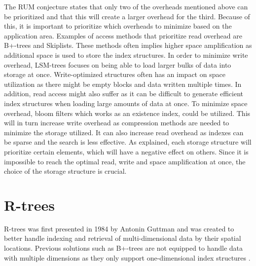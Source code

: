 \noindent
The RUM conjecture states that only two of the overheads mentioned above can be prioritized and that this will create a larger overhead for the third. Because of this, it is important to prioritize which overheads to minimize based on the application area. Examples of access methods that prioritize read overhead are B+-trees and Skiplists. These methods often implies higher space amplification as additional space is used to store the index structures. In order to minimize write overhead, LSM-trees focuses on being able to load larger bulks of data into storage at once. Write-optimized structures often has an impact on space utilization as there might be empty blocks and data written multiple times. In addition, read access might also suffer as it can be difficult to generate efficient index structures when loading large amounts of data at once. To minimize space overhead, bloom filters which works as an existence index, could be utilized. This will in turn increase write overhead as compression methods are needed to minimize the storage utilized. It can also increase read overhead as indexes can be sparse and the search is less effective. As explained, each storage structure will prioritize certain elements, which will have a negative effect on others. Since it is impossible to reach the optimal read, write and space amplification at once, the choice of the storage structure is crucial. 

\section{R-trees}
R-trees was first presented in 1984 by Antonin Guttman\cite{r-tree} and was created to better handle indexing and retrieval of multi-dimensional data by their spatial locations. Previous solutions such as B+-trees are not equipped to handle data with multiple dimensions as they only support one-dimensional index structures \cite{ComparisonOfAdvancedTree}. \newline

